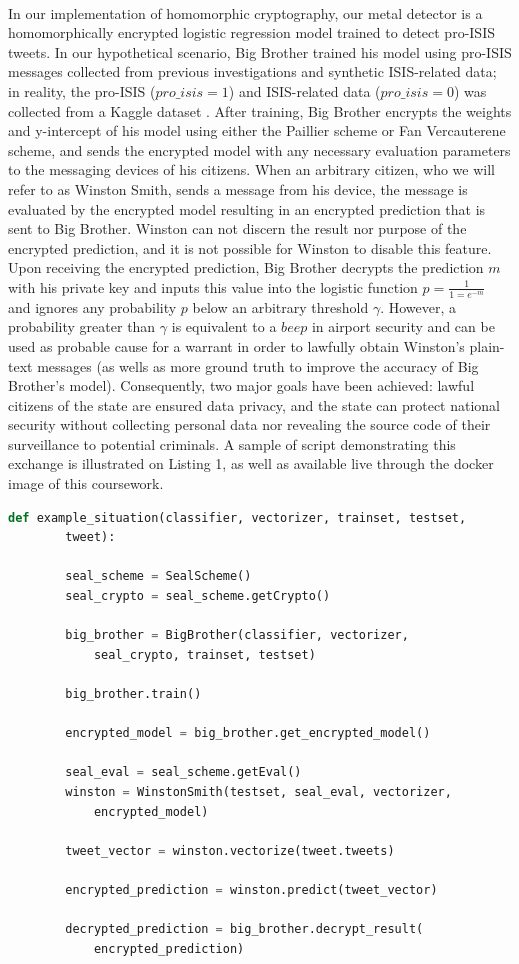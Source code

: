\documentclass[10pt, a4paper]{article}
\begin{document}
	\paragraph{}In our implementation of homomorphic cryptography, our metal detector is a homomorphically encrypted logistic regression model trained to detect pro-ISIS tweets. In our hypothetical scenario,  Big Brother trained his model using pro-ISIS messages collected from previous investigations and synthetic ISIS-related data; in reality, the pro-ISIS ($pro\_isis=1$) and ISIS-related data ($pro\_isis=0$) was collected from a Kaggle dataset \cite{ISIS}. After training, Big Brother encrypts the weights and y-intercept of his model using either the Paillier scheme or Fan Vercauterene scheme, and sends the encrypted model with any necessary evaluation parameters to the messaging devices of his citizens. When an arbitrary citizen, who we will refer to as Winston Smith, sends a message from his device, the message is evaluated by the encrypted model resulting in an encrypted prediction that is sent to Big Brother. Winston can not discern the result nor purpose of the encrypted prediction, and it is not possible for Winston to disable this feature. Upon receiving the encrypted prediction, Big Brother decrypts the prediction $m$ with his private key and inputs this value into the logistic function $p = \frac{1}{1 = e^{-m}}$ and ignores any probability $p$ below an arbitrary threshold $\gamma$. However, a probability greater than $\gamma$ is equivalent to a $beep$ in airport security and can be used as probable cause for a warrant in order to lawfully obtain Winston's plain-text messages (as wells as more ground truth to improve the accuracy of Big Brother's model). Consequently, two major goals have been achieved:  lawful citizens of the state are ensured data privacy, and the state can protect national security without collecting personal data nor revealing the source code of their surveillance to potential criminals. A sample of script demonstrating this exchange is illustrated on Listing 1, as well as available live through the docker image of this coursework.

	\begin{lstlisting}[language=Python,caption = Example Exchange]
	def example_situation(classifier, vectorizer, trainset, testset, 
		tweet):
	
		seal_scheme = SealScheme()
		seal_crypto = seal_scheme.getCrypto()
		
		big_brother = BigBrother(classifier, vectorizer, 
			seal_crypto, trainset, testset)
		
		big_brother.train()
		
		encrypted_model = big_brother.get_encrypted_model()
		
		seal_eval = seal_scheme.getEval()
		winston = WinstonSmith(testset, seal_eval, vectorizer, 
			encrypted_model)
		
		tweet_vector = winston.vectorize(tweet.tweets)
		
		encrypted_prediction = winston.predict(tweet_vector)

		decrypted_prediction = big_brother.decrypt_result(
			encrypted_prediction)
	\end{lstlisting}
	
\end{document}
